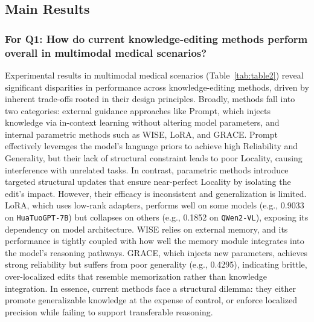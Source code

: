 \documentclass[letterpaper]{article} %
\begin{document}
\subsection{Main Results}

\subsubsection{For Q1: How do current knowledge-editing methods perform overall in multimodal medical scenarios?}
Experimental results in multimodal medical scenarios (Table~\ref{tab:table2}) reveal significant disparities in performance across knowledge-editing methods, driven by inherent trade-offs rooted in their design principles. Broadly, methods fall into two categories: external guidance approaches like Prompt, which injects knowledge via in-context learning without altering model parameters, and internal parametric methods such as WISE, LoRA, and GRACE. Prompt effectively leverages the model’s language priors to achieve high Reliability and Generality, but their lack of structural constraint leads to poor Locality, causing interference with unrelated tasks. In contrast, parametric methods introduce targeted structural updates that ensure near-perfect Locality by isolating the edit’s impact. However, their efficacy is inconsistent and generalization is limited. LoRA, which uses low-rank adapters, performs well on some models (e.g., 0.9033 on \texttt{HuaTuoGPT-7B}) but collapses on others (e.g., 0.1852 on \texttt{QWen2-VL}), exposing its dependency on model architecture. WISE relies on external memory, and its performance is tightly coupled with how well the memory module integrates into the model’s reasoning pathways. GRACE, which injects new parameters, achieves strong reliability but suffers from poor generality (e.g., 0.4295), indicating brittle, over-localized edits that resemble memorization rather than knowledge integration. In essence, current methods face a structural dilemma: they either promote generalizable knowledge at the expense of control, or enforce localized precision while failing to support transferable reasoning.
\end{document}
